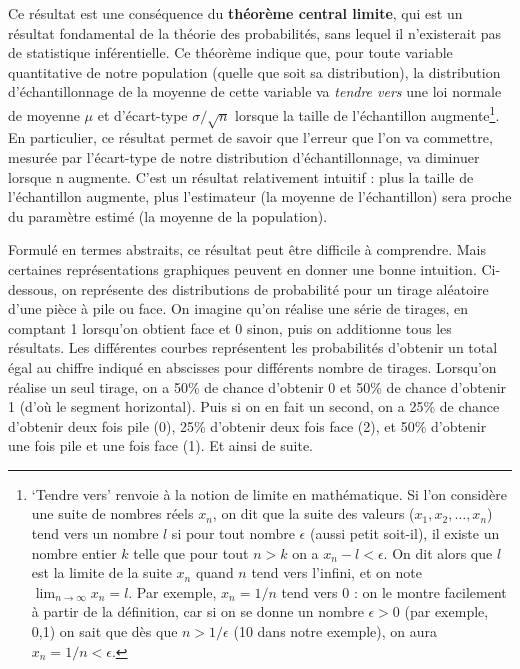 \documentclass[
  french,
]{book}
\begin{document}
Ce résultat est une conséquence du \textbf{théorème central limite}, qui est un résultat fondamental de la théorie des probabilités, sans lequel il n'existerait pas de statistique inférentielle. Ce théorème indique que, pour toute variable quantitative de notre population (quelle que soit sa distribution), la distribution d'échantillonnage de la moyenne de cette variable va \emph{tendre vers} une loi normale de moyenne \(\mu\) et d'écart-type \(\sigma/{\sqrt{n}}\) lorsque la taille de l'échantillon augmente\footnote{`Tendre vers' renvoie à la notion de limite en mathématique. Si l'on considère une suite de nombres réels \(x_n\), on dit que la suite des valeurs (\(x_1, x_2, …, x_n\)) tend vers un nombre \(l\) si pour tout nombre \(\epsilon\) (aussi petit soit-il), il existe un nombre entier \(k\) telle que pour tout \(n > k\) on a \(x_n - l < \epsilon\). On dit alors que \(l\) est la limite de la suite \(x_n\) quand \(n\) tend vers l'infini, et on note \(\lim_{n\to\infty} x_n = l\). Par exemple, \(x_n = 1/n\) tend vers 0 : on le montre facilement à partir de la définition, car si on se donne un nombre \(\epsilon > 0\) (par exemple, 0,1) on sait que dès que \(n > 1/\epsilon\) (10 dans notre exemple), on aura \(x_n = 1/n < \epsilon\).}. En particulier, ce résultat permet de savoir que l'erreur que l'on va commettre, mesurée par l'écart-type de notre distribution d'échantillonnage, va diminuer lorsque n augmente. C'est un résultat relativement intuitif : plus la taille de l'échantillon augmente, plus l'estimateur (la moyenne de l'échantillon) sera proche du paramètre estimé (la moyenne de la population).

Formulé en termes abstraits, ce résultat peut être difficile à comprendre. Mais certaines représentations graphiques peuvent en donner une bonne intuition. Ci-dessous, on représente des distributions de probabilité pour un tirage aléatoire d'une pièce à pile ou face. On imagine qu'on réalise une série de tirages, en comptant 1 lorsqu'on obtient face et 0 sinon, puis on additionne tous les résultats. Les différentes courbes représentent les probabilités d'obtenir un total égal au chiffre indiqué en abscisses pour différents nombre de tirages. Lorsqu'on réalise un seul tirage, on a 50\% de chance d'obtenir 0 et 50\% de chance d'obtenir 1 (d'où le segment horizontal). Puis si on en fait un second, on a 25\% de chance d'obtenir deux fois pile (0), 25\% d'obtenir deux fois face (2), et 50\% d'obtenir une fois pile et une fois face (1). Et ainsi de suite.
\end{document}
